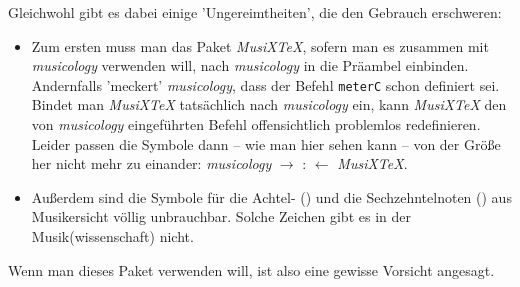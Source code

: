 Gleichwohl gibt es dabei einige 'Ungereimtheiten', die den Gebrauch erschweren:
\begin{itemize}
  \item Zum ersten muss man das Paket \emph{MusiX\TeX}, sofern man es zusammen
  mit \emph{musicology} verwenden will, nach \emph{musicology} in die Präambel
  einbinden. Andernfalls 'meckert' \emph{musicology}, dass der Befehl
  \texttt{meterC} schon definiert sei. Bindet man \emph{MusiX\TeX} tatsächlich
  nach \emph{musicology} ein, kann \emph{MusiX\TeX} den von \emph{musicology}
  eingeführten Befehl offensichtlich problemlos redefinieren. Leider passen die
  Symbole dann -- wie man hier sehen kann -- von der Größe her nicht mehr zu
  einander: \emph{musicology} $\rightarrow$ \meterCutC : \meterC $\leftarrow$
  \emph{MusiX\TeX}.
  \item Außerdem sind die Symbole für die Achtel- (\musEighth) und die
  Sechzehntelnoten (\musSixteenth) aus Musikersicht völlig unbrauchbar. Solche
  Zeichen gibt es in der Musik(wissenschaft) nicht.
\end{itemize}

Wenn man dieses Paket verwenden will, ist also eine gewisse Vorsicht angesagt.


%
